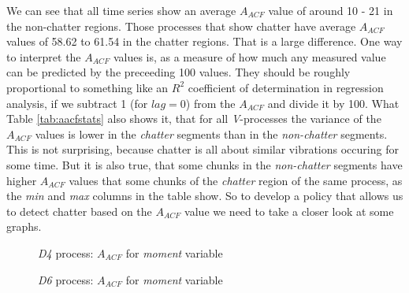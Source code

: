 \documentclass[12 pt]{scrartcl}
\begin{document}
We can see that all time series show an average $A_{ACF}$ value of around 10 - 21 in the non-chatter regions. Those processes that show chatter have average $A_{ACF}$ values of 58.62 to 61.54 in the chatter regions. That is a large difference. One way to interpret the $A_{ACF}$ values is, as a measure of how much any measured value can be predicted by the preceeding 100 values. They should be roughly proportional to something like an $R^2$ coefficient of determination in regression analysis, if we subtract 1 (for $lag = 0$) from the $A_{ACF}$ and divide it by 100. What Table \ref{tab:aacfstats} also shows it, that for all \emph{V}-processes the variance of the $A_{ACF}$ values is lower in the \emph{chatter} segments than in the \emph{non-chatter} segments. This is not surprising, because chatter is all about similar vibrations occuring for some time.
But it is also true, that some chunks in the \emph{non-chatter} segments have higher $A_{ACF}$ values that some chunks of the \emph{chatter} region of the same process, as the \emph{min} and \emph{max} columns in the table show. So to develop a policy that allows us to detect chatter based on the $A_{ACF}$ value we need to take a closer look at some graphs.

\begin{figure}[p]
  \caption{\emph{D4} process: $A_{ACF}$ for \emph{moment} variable}
  \label{fig:d4-moment-aacf}
\end{figure}


\begin{figure}[p]
  \caption{\emph{D6} process: $A_{ACF}$ for \emph{moment} variable}
  \label{fig:d6-moment-aacf}
\end{figure}
\end{document}
